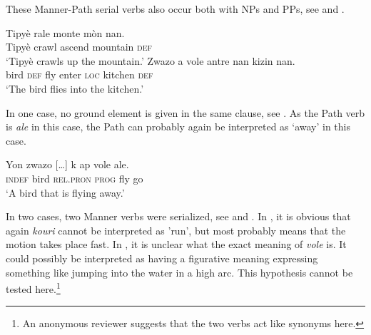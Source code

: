 \documentclass[output=paper,colorlinks,citecolor=brown]{langscibook}
\begin{document}
\begin{table}[!ht]
\centering
{}
\caption{MANNER-PATH-SVC in the single picture descriptions}
\label{tab:tab4_03}
\end{table}

These Manner-Path serial verbs also occur both with NPs and PPs, see  and .

\ea\label{ex:3:57}
\gll Tipyè rale monte mòn nan. \\
     Tipyè crawl ascend mountain \textsc{def} \\
\glt ‘Tipyè crawls up the mountain.’
\ex\label{ex:3:58}
\gll Zwazo  a vole antre nan kizin nan. \\
     bird \textsc{def} fly enter \textsc{loc} kitchen \textsc{def} \\
\glt ‘The bird flies into the kitchen.’
\z

In one case, no ground element is given in the same clause, see . As the Path verb is \emph{ale} in this case, the Path can probably again be interpreted as ‘away’ in this case.

\ea\label{ex:3:59}
\gll  Yon zwazo {[}…{]} k ap vole ale. \\
      \textsc{indef} bird   {} \textsc{rel.pron} \textsc{prog} fly go \\
\glt ‘A bird that is flying away.’
\z

In two cases, two Manner verbs were serialized, see  and . In , it is obvious that again \emph{kouri} cannot be interpreted as 'run', but most probably means that the motion takes place fast. In , it is unclear what the exact meaning of \emph{vole} is. It could possibly be interpreted as having a figurative meaning expressing something like jumping into the water in a high arc. This hypothesis cannot be tested here.\footnote{An anonymous reviewer suggests that the two verbs act like synonyms here.}
\end{document}
